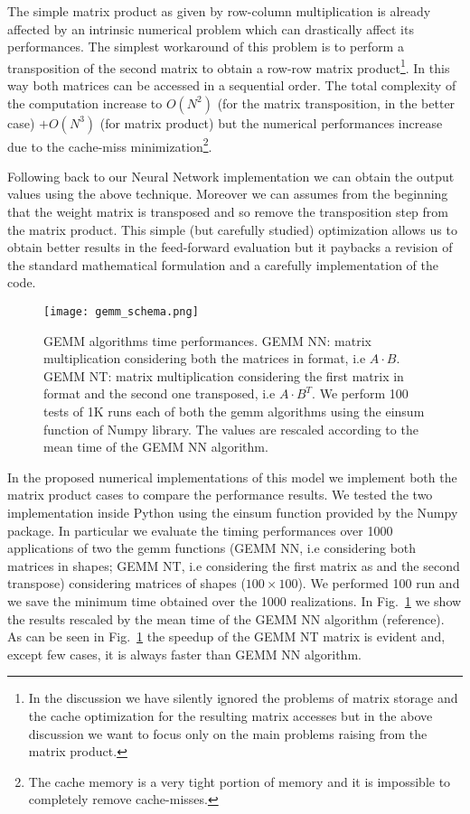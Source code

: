 \documentclass{standalone}
\begin{document}
The simple matrix product as given by row-column multiplication is already affected by an intrinsic numerical problem which can drastically affect its performances.
The simplest workaround of this problem is to perform a transposition of the second matrix to obtain a row-row matrix product\footnote{
  In the discussion we have silently ignored the problems of matrix storage and the cache optimization for the resulting matrix accesses but in the above discussion we want to focus only on the main problems raising from the matrix product.
}.
In this way both matrices can be accessed in a sequential order.
The total complexity of the computation increase to $O(N^2)$ (for the matrix transposition, in the better case) $+ O(N^3)$ (for matrix product) but the numerical performances increase due to the cache-miss minimization\footnote{
  The cache memory is a very tight portion of memory and it is impossible to completely remove cache-misses.
}.

Following back to our Neural Network implementation we can obtain the output values using the above technique.
Moreover we can assumes from the beginning that the weight matrix is transposed and so remove the transposition step from the matrix product.
This simple (but carefully studied) optimization allows us to obtain better results in the feed-forward evaluation but it paybacks a revision of the standard mathematical formulation and a carefully implementation of the code.

\begin{figure}[htbp]
\texttt{[image: gemm\_schema.png]}
\quad
\centering
\def\svgwidth{0.45\textwidth}

\caption{GEMM algorithms time performances.
GEMM NN: matrix multiplication considering both the matrices in  format, i.e $A\cdot B$.
GEMM NT: matrix multiplication considering the first matrix in  format and the second one transposed, i.e $A\cdot B^T$.
We perform 100 tests of 1K runs each of both the gemm algorithms using the \textsf{einsum} function of Numpy library.
The values are rescaled according to the mean time of the GEMM NN algorithm.
}
\label{fig:gemm}
\end{figure}

In the proposed numerical implementations of this model we implement both the matrix product cases to compare the performance results.
We tested the two implementation inside Python using the \textsf{einsum} function provided by the Numpy package.
In particular we evaluate the timing performances over 1000 applications of two the gemm functions (GEMM NN, i.e considering both matrices in  shapes; GEMM NT, i.e considering the first matrix as  and the second transpose) considering matrices of shapes ($100\times100$).
We performed 100 run and we save the minimum time obtained over the 1000 realizations.
In Fig.~\ref{fig:gemm} we show the results rescaled by the mean time of the GEMM NN algorithm (reference).
As can be seen in Fig.~\ref{fig:gemm} the speedup of the GEMM NT matrix is evident and, except few cases, it is always faster than GEMM NN algorithm.
\end{document}
